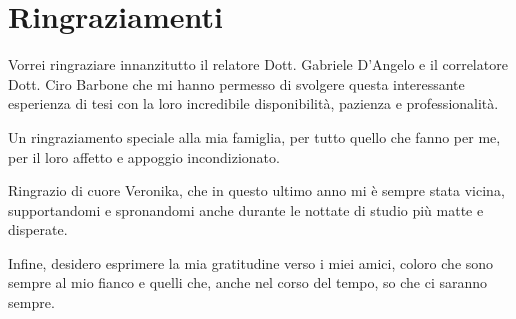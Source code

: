 \chapter{Ringraziamenti}
Vorrei ringraziare innanzitutto il relatore Dott. Gabriele D'Angelo e il correlatore Dott. Ciro Barbone 
 che mi hanno permesso di svolgere  questa interessante esperienza di tesi con la loro incredibile 
 disponibilità, pazienza e professionalità.

 Un ringraziamento speciale alla mia famiglia, per tutto quello che fanno per me, per il loro affetto  e appoggio incondizionato.
 
 Ringrazio di cuore Veronika, che in questo ultimo anno mi è sempre stata  vicina, supportandomi  e spronandomi anche durante le nottate di studio più matte e disperate.

 Infine, desidero esprimere la mia gratitudine verso i miei amici, coloro che sono sempre  al mio fianco e quelli che, anche nel corso del tempo, so che ci saranno sempre.
 